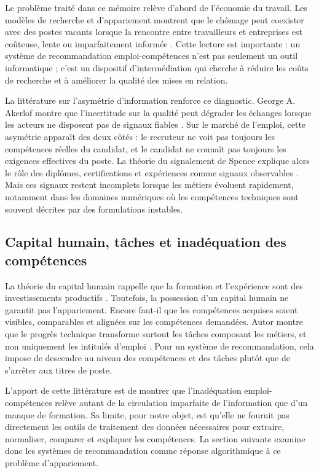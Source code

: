 Le problème traité dans ce mémoire relève d'abord de l'économie du travail. Les modèles de recherche et d'appariement montrent que le chômage peut coexister avec des postes vacants lorsque la rencontre entre travailleurs et entreprises est coûteuse, lente ou imparfaitement informée \cite{mortensen1994job,pissarides2000equilibrium}. Cette lecture est importante : un système de recommandation emploi-compétences n'est pas seulement un outil informatique ; c'est un dispositif d'intermédiation qui cherche à réduire les coûts de recherche et à améliorer la qualité des mises en relation.

La littérature sur l'asymétrie d'information renforce ce diagnostic. George A. Akerlof montre que l'incertitude sur la qualité peut dégrader les échanges lorsque les acteurs ne disposent pas de signaux fiables \cite{akerlof1970lemons}. Sur le marché de l'emploi, cette asymétrie apparaît des deux côtés : le recruteur ne voit pas toujours les compétences réelles du candidat, et le candidat ne connaît pas toujours les exigences effectives du poste. La théorie du signalement de Spence explique alors le rôle des diplômes, certifications et expériences comme signaux observables \cite{spence1973job}. Mais ces signaux restent incomplets lorsque les métiers évoluent rapidement, notamment dans les domaines numériques où les compétences techniques sont souvent décrites par des formulations instables.

\subsection{Capital humain, tâches et inadéquation des compétences}

La théorie du capital humain rappelle que la formation et l'expérience sont des investissements productifs \cite{becker1964human}. Toutefois, la possession d'un capital humain ne garantit pas l'appariement. Encore faut-il que les compétences acquises soient visibles, comparables et alignées sur les compétences demandées. Autor montre que le progrès technique transforme surtout les tâches composant les métiers, et non uniquement les intitulés d'emploi \cite{autor2013growth}. Pour un système de recommandation, cela impose de descendre au niveau des compétences et des tâches plutôt que de s'arrêter aux titres de poste.

L'apport de cette littérature est de montrer que l'inadéquation emploi-compétences relève autant de la circulation imparfaite de l'information que d'un manque de formation. Sa limite, pour notre objet, est qu'elle ne fournit pas directement les outils de traitement des données nécessaires pour extraire, normaliser, comparer et expliquer les compétences. La section suivante examine donc les systèmes de recommandation comme réponse algorithmique à ce problème d'appariement.

